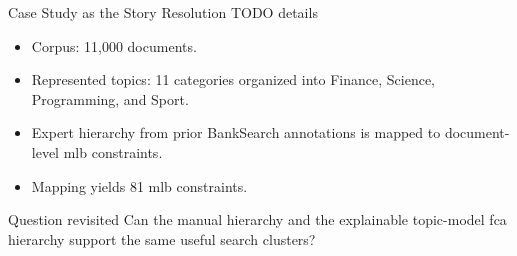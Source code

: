 \begin{frame}{Case Study as the Story Resolution TODO details}
\begin{itemize}
    \item Corpus: 11,000 documents.
    \item Represented topics: 11 categories organized into Finance, Science, Programming, and Sport.
    \item Expert hierarchy from prior BankSearch annotations is mapped to document-level \ac{mlb} constraints.
    \item Mapping yields 81 \ac{mlb} constraints.
\end{itemize}

\vspace{0.5em}
\begin{block}{Question revisited}
Can the manual hierarchy and the explainable topic-model \ac{fca} hierarchy support the same useful search clusters?
\end{block}
\end{frame}




